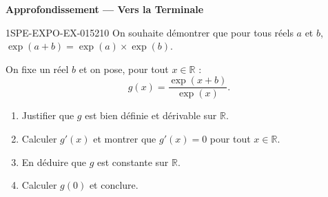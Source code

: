 \begin{center}\textbf{Approfondissement — Vers la Terminale}\end{center}
\begin{exercice}{1SPE-EXPO-EX-015}{2}{10}
On souhaite démontrer que pour tous réels $a$ et $b$, $\exp(a+b) = \exp(a) \times \exp(b)$.

On fixe un réel $b$ et on pose, pour tout $x \in \mathbb{R}$ :
\[ g(x) = \frac{\exp(x+b)}{\exp(x)}. \]
\begin{enumerate}
  \item Justifier que $g$ est bien définie et dérivable sur $\mathbb{R}$.
  \item Calculer $g'(x)$ et montrer que $g'(x) = 0$ pour tout $x \in \mathbb{R}$.
  \item En déduire que $g$ est constante sur $\mathbb{R}$.
  \item Calculer $g(0)$ et conclure.
\end{enumerate}
\end{exercice}
